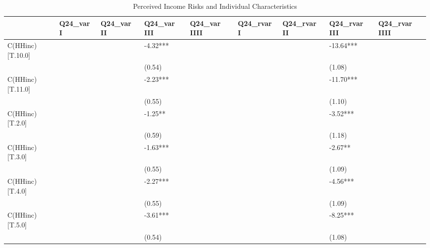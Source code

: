 
\begin{table}[ht]
\begin{adjustbox}{width={15cm},totalheight={20cm}}
\begin{threeparttable}
\caption{Perceived Income Risks and Individual Characteristics}
\label{micro_reg}\begin{tabular}{lllllllll}
\toprule
{} & Q24\_var I & Q24\_var II & Q24\_var III & Q24\_var IIII & Q24\_rvar I & Q24\_rvar II & Q24\_rvar III & Q24\_rvar IIII \\
\midrule
C(HHinc)[T.10.0]   &           &            &    -4.32*** &              &            &             &    -13.64*** &               \\
                   &           &            &      (0.54) &              &            &             &       (1.08) &               \\
C(HHinc)[T.11.0]   &           &            &    -2.23*** &              &            &             &    -11.70*** &               \\
                   &           &            &      (0.55) &              &            &             &       (1.10) &               \\
C(HHinc)[T.2.0]    &           &            &     -1.25** &              &            &             &     -3.52*** &               \\
                   &           &            &      (0.59) &              &            &             &       (1.18) &               \\
C(HHinc)[T.3.0]    &           &            &    -1.63*** &              &            &             &      -2.67** &               \\
                   &           &            &      (0.55) &              &            &             &       (1.09) &               \\
C(HHinc)[T.4.0]    &           &            &    -2.27*** &              &            &             &     -4.56*** &               \\
                   &           &            &      (0.55) &              &            &             &       (1.09) &               \\
C(HHinc)[T.5.0]    &           &            &    -3.61*** &              &            &             &     -8.25*** &               \\
                   &           &            &      (0.54) &              &            &             &       (1.08) &               \\

\end{tabular}
\end{threeparttable}
\end{adjustbox}
\end{table}
